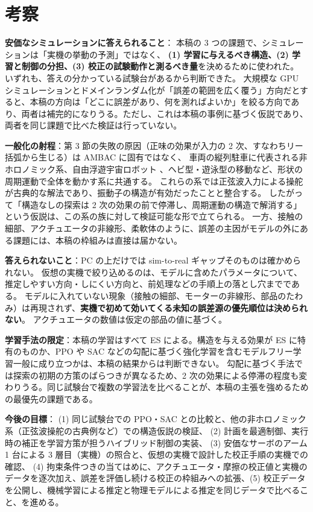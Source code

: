 \documentclass[paper=a4paper,fontsize=10pt,twocolumn,column_gap=2zw,line_length=24zw,number_of_lines=46,head_space=20mm]{jlreq}
\begin{document}
\section{考察}

\textbf{安価なシミュレーションに答えられること}：
本稿の 3 つの課題で、シミュレーションは「実機の挙動の予測」ではなく、
\textbf{(1) 学習に与えるべき構造、(2) 学習と制御の分担、(3) 校正の試験動作と測るべき量}を決めるために使われた。
いずれも、答えの分かっている試験台があるから判断できた。
大規模な GPU シミュレーションとドメインランダム化が「誤差の範囲を広く覆う」方向だとすると、本稿の方向は「どこに誤差があり、何を測ればよいか」を絞る方向であり、両者は補完的になりうる。ただし、これは本稿の事例に基づく仮説であり、両者を同じ課題で比べた検証は行っていない。

\textbf{一般化の射程}：第 3 節の失敗の原因（正味の効果が入力の 2 次、すなわちリー括弧から生じる）は AMBAC に固有ではなく、
車両の縦列駐車に代表される非ホロノミック系、自由浮遊宇宙ロボット \cite{nakamura1991}、ヘビ型・遊泳型の移動など、形状の周期運動で全体を動かす系に共通する。
これらの系では正弦波入力による操舵 \cite{murray1993} が古典的な解法であり、振動子の構造が有効だったことと整合する。
したがって「構造なしの探索は 2 次の効果の前で停滞し、周期運動の構造で解消する」という仮説は、この系の族に対して検証可能な形で立てられる。
一方、接触の細部、アクチュエータの非線形、柔軟体のように、誤差の主因がモデルの外にある課題には、本稿の枠組みは直接は届かない。

\textbf{答えられないこと}：PC の上だけでは sim-to-real ギャップそのものは確かめられない。
仮想の実機で絞り込めるのは、モデルに含めたパラメータについて、推定しやすい方向・しにくい方向と、前処理などの手順上の落とし穴までである。
モデルに入れていない現象（接触の細部、モーターの非線形、部品のたわみ）は再現されず、\textbf{実機で初めて効いてくる未知の誤差源の優先順位は決められない}。
アクチュエータの数値は仮定の部品の値に基づく。

\textbf{学習手法の限定}：本稿の学習はすべて ES による。構造を与える効果が ES に特有のものか、PPO や SAC などの勾配に基づく強化学習を含むモデルフリー学習一般に成り立つかは、本稿の結果からは判断できない。
勾配に基づく手法では探索の初期の方策のばらつきが異なるため、2 次の効果による停滞の程度も変わりうる。同じ試験台で複数の学習法を比べることが、本稿の主張を強めるための最優先の課題である。

\textbf{今後の目標}：
(1) 同じ試験台での PPO・SAC との比較と、他の非ホロノミック系（正弦波操舵の古典例など）での構造仮説の検証、
(2) 計画を最適制御、実行時の補正を学習方策が担うハイブリッド制御の実装、
(3) 安価なサーボのアーム 1 台による 3 層目（実機）の照合と、仮想の実機で設計した校正手順の実機での確認、
(4) 拘束条件つきの当てはめに、アクチュエータ・摩擦の校正値と実機のデータを逐次加え、誤差を評価し続ける校正の枠組みへの拡張、(5) 校正データを公開し、機械学習による推定と物理モデルによる推定を同じデータで比べること、を進める。
\end{document}
